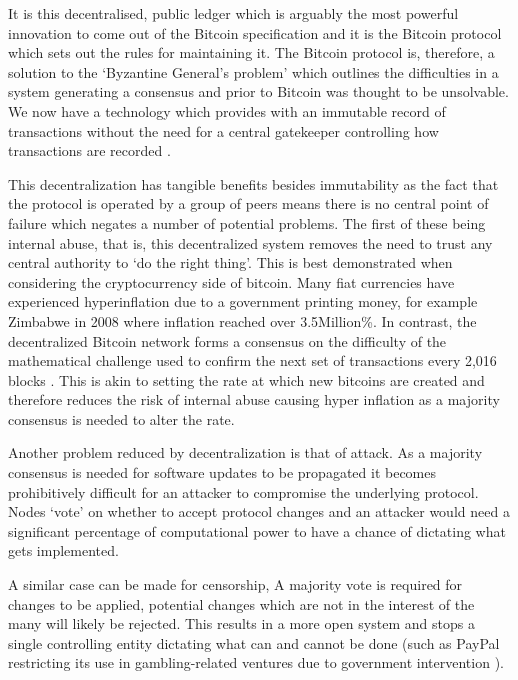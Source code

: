 \documentclass{article}
\begin{document}
It is this decentralised, public ledger which is arguably the most powerful innovation to come out of the Bitcoin specification and it is the Bitcoin protocol which sets out the rules for maintaining it. The Bitcoin protocol is, therefore, a solution to the `Byzantine General's problem’ \citep{18_lamport_shostak_pease_1982} which outlines the difficulties in a system generating a consensus and prior to Bitcoin was thought to be unsolvable. We now have a technology which provides with an immutable record of transactions without the need for a central gatekeeper controlling how transactions are recorded \citep{19_campbell_2015}.

This decentralization has tangible benefits besides immutability as the fact that the protocol is operated by a group of peers means there is no central point of failure which negates a number of potential problems. The first of these being internal abuse, that is, this decentralized system removes the need to trust any central authority to `do the right thing'. This is best demonstrated when considering the cryptocurrency side of bitcoin. Many fiat currencies have experienced hyperinflation due to a government printing money, for example Zimbabwe in 2008 \citep{21_zimbabwe_phases_out_local_currency_at_35_quadrillion_to_us_2015} where inflation reached over 3.5Million\%. In contrast, the decentralized Bitcoin network forms a consensus on the difficulty of the mathematical challenge used to confirm the next set of transactions every 2,016 blocks \citep{20_developer_guide_bitcoin_2016}. This is akin to setting the rate at which new bitcoins are created and therefore reduces the risk of internal abuse causing hyper inflation as a majority consensus is needed to alter the rate.

Another problem reduced by decentralization is that of attack. As a majority consensus is needed for software updates to be propagated \citep{21_zimbabwe_phases_out_local_currency_at_35_quadrillion_to_us_2015}\citep{22_brave_new_coin_2016} it becomes prohibitively difficult for an attacker to compromise the underlying protocol. Nodes `vote' on whether to accept protocol changes and an attacker would need a significant percentage of computational power to have a chance of dictating what gets implemented.

A similar case can be made for censorship, A majority vote is required for changes to be applied, potential changes which are not in the interest of the many will likely be rejected. This results in a more open system and stops a single controlling entity dictating what can and cannot be done (such as PayPal restricting its use in gambling-related ventures due to government intervention \citep{23_customer_support_2016}).
\end{document}
